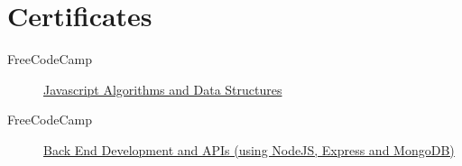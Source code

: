 \documentclass[a4paper]{article}
\begin{document}
\section{Certificates}
\begin{description}
	\item[FreeCodeCamp]
	      \href{https://www.freecodecamp.org/certification/jaydamani/javascript-algorithms-and-data-structures}{
		      Javascript Algorithms and Data Structures
	      }
	\item[FreeCodeCamp]
	      \href{https://www.freecodecamp.org/certification/jaydamani/back-end-development-and-apis}{
		      Back End Development and APIs (using NodeJS, Express and MongoDB)
	      }
\end{description}
\end{document}
